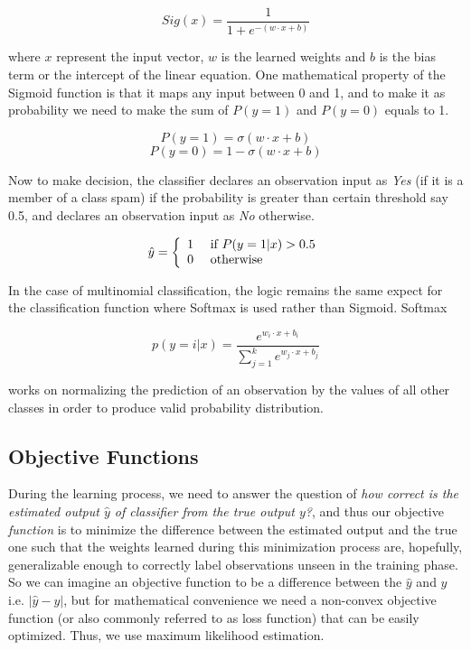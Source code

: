 $$Sig ( x ) = \frac { 1 } { 1 + e ^ { - (w \cdot x +b)} }$$ 

where $x$ represent the input vector, $w$ is the learned weights and $b$ is the bias term or the intercept of the linear equation. One mathematical property of the Sigmoid function is that it maps any input between 0 and 1, and to make it as probability we need to make the sum of $P(y=1)$ and $P(y=0)$ equals to 1. 

$$ P ( y = 1 ) = \sigma ( w \cdot x + b ) $$
$$ P ( y = 0 ) = 1 - \sigma ( w \cdot x + b ) $$

Now to make decision, the classifier declares an observation input as \emph{Yes} (if it is a member of a class spam) if the probability is greater than certain threshold say 0.5, and declares an observation input as \emph{No} otherwise. 

$$  \hat { y } = \left\{ \begin{array} { l l } { 1 } & { \text { if } P ( y = 1 | x ) > 0.5 } \\ { 0 } & { \text { otherwise } } \end{array} \right.  $$


In the case of multinomial classification, the logic remains the same expect for the classification function where Softmax is used rather than Sigmoid. Softmax 

$$p ( y = i | x ) = \frac { e ^ { w _ { i } \cdot x + b _ { i } } } { \sum _ { j = 1 } ^ { k } e ^ { w _ { j } \cdot x + b _ { j } } }$$

works on normalizing the prediction of an observation by the values of all other classes in order to produce valid probability distribution. 

\subsection{Objective Functions}

During the learning process, we need to answer the question of \emph{how correct is the estimated output $\hat{y}$ of classifier from the true output $y$?}, and thus our objective \emph{function} is to minimize the difference between the estimated output and the true one such that the weights learned during this minimization process are, hopefully,  generalizable enough to correctly label observations unseen in the training phase. So we can imagine an objective function to be a difference between the $\hat{y}$ and $y$ i.e. $\left | \hat{y} - y \right |$, but for mathematical convenience we need a non-convex objective function (or also commonly referred to as loss function)  that can be easily optimized. Thus, we use maximum likelihood estimation. 

